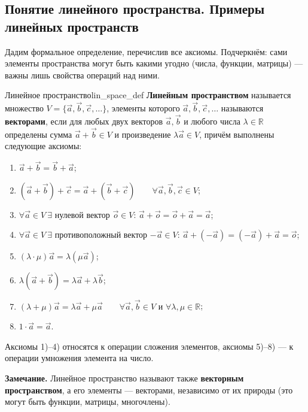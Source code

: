 \documentclass[12pt,a4paper]{article}
\begin{document}
\subsection{Понятие линейного пространства. Примеры линейных пространств}

Дадим формальное определение, перечислив все аксиомы. Подчеркнём: сами
элементы пространства могут быть какими угодно (числа, функции,
матрицы) — важны лишь свойства операций над ними.

\begin{definition}{Линейное пространство}{lin_space_def}
  \textbf{Линейным пространством} называется множество
  $V = \{\vec{a}, \vec{b}, \vec{c}, \dots\}$, элементы которого
  $\vec{a}, \vec{b}, \vec{c}, \dots$ называются \textbf{векторами},
  если для любых двух векторов $\vec{a}, \vec{b}$ и любого числа
  $\lambda \in \mathbb{R}$ определены сумма $\vec{a} + \vec{b} \in V$ и
  произведение $\lambda\vec{a} \in V$, причём выполнены следующие
  аксиомы:
  \begin{enumerate}
    \item $\vec{a} + \vec{b} = \vec{b} + \vec{a}$;
    \item $(\vec{a} + \vec{b}) + \vec{c} = \vec{a} + (\vec{b} + \vec{c})
      \qquad \forall \vec{a}, \vec{b}, \vec{c} \in V$;
    \item $\forall \vec{a} \in V \ \exists$ нулевой вектор
      $\vec{o} \in V$: $\vec{a} + \vec{o} = \vec{o} + \vec{a} = \vec{a}$;
    \item $\forall \vec{a} \in V \ \exists$ противоположный вектор
      $-\vec{a} \in V$: $\vec{a} + (-\vec{a}) = (-\vec{a}) + \vec{a} = \vec{o}$;
    \item $(\lambda \cdot \mu)\vec{a} = \lambda(\mu\vec{a})$;
    \item $\lambda(\vec{a} + \vec{b}) = \lambda\vec{a} + \lambda\vec{b}$;
    \item $(\lambda + \mu)\vec{a} = \lambda\vec{a} + \mu\vec{a}
      \qquad \forall \vec{a}, \vec{b} \in V \text{ и } \forall
      \lambda, \mu \in \mathbb{R}$;
    \item $1 \cdot \vec{a} = \vec{a}$.
  \end{enumerate}
Аксиомы 1)--4) относятся к операции сложения элементов, аксиомы
5)--8) — к операции умножения элемента на число.
\end{definition}

\noindent\textbf{Замечание.} Линейное пространство называют также
\textbf{векторным пространством}, а его элементы — векторами,
независимо от их природы (это могут быть функции, матрицы, многочлены).
\end{document}
